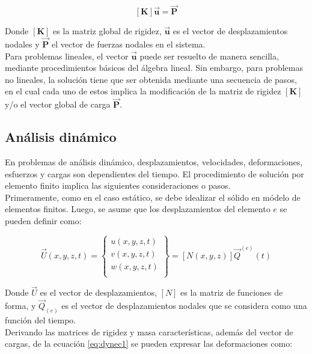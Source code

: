 \begin{equation}
\bm{\left[K\right] \vec{u} = \vec{P}}
\end{equation}

Donde $\bm{[K]}$ es la matriz global de rigidez, $\bm{\vec{u}}$ es el vector de desplazamientos nodales y $\bm{\vec{P}}$ el vector de fuerzas nodales en el sistema.\\

Para problemas lineales, el vector $\bm{\vec{u}}$ puede ser resuelto de manera sencilla, mediante procedimientos básicos del álgebra lineal. Sin embargo, para problemas no lineales, la solución tiene que ser obtenida mediante una secuencia de pasos, en el cual cada uno de estos implica la modificación de la matriz de rigidez $\bm{[K]}$ y/o el vector global de carga $\bm{\vec{P}}$.

\subsection{Análisis dinámico}

En problemas de análisis dinámico, desplazamientos, velocidades, deformaciones, esfuerzos y cargas 
son dependientes del tiempo. El procedimiento de solución por elemento finito implica las siguientes 
consideraciones o pasos.\\

Primeramente, como en el caso estático, se debe idealizar el sólido en módelo de elementos finitos. 
Luego, se asume que los desplazamientos del elemento $e$ se pueden definir como:

\begin{equation}\label{eq:dynec1}
\vec{U}(x,y,z,t) = 
\left\{ \begin{matrix}
u(x,y,z,t) \\ v(x,y,z,t) \\ w(x,y,z,t) \\
\end{matrix} \right\} = 
[N(x,y,z)] \vec{Q}^{(e)}(t)
\end{equation}

Donde $\vec{U}$ es el vector de desplazamientos, $[N]$ es la matriz de funciones de forma, y $\vec{Q}_{(e)}$ 
es el vector de desplazamientos nodales que se considera como una función del tiempo.\\

Derivando las matrices de rigidez y masa características, además del vector de cargas, de la ecuación \ref{eq:dynec1} 
se pueden expresar las deformaciones como:

